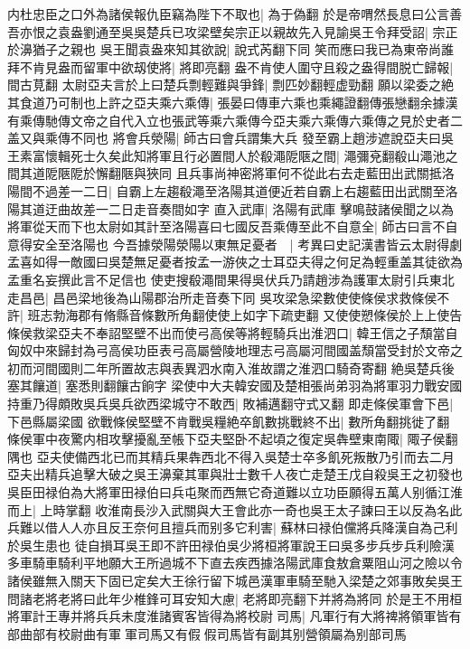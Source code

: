 内杜忠臣之口外為諸侯報仇臣竊為陛下不取也|{
	為于偽翻}
於是帝喟然長息曰公言善吾亦恨之袁盎劉通至吳吳楚兵已攻梁壁矣宗正以親故先入見諭吳王令拜受詔|{
	宗正於濞猶子之親也}
吳王聞袁盎來知其欲說|{
	說式芮翻下同}
笑而應曰我已為東帝尚誰拜不肯見盎而留軍中欲刼使將|{
	將即亮翻}
盎不肯使人圍守且殺之盎得間脱亡歸報|{
	間古莧翻}
太尉亞夫言於上曰楚兵剽輕難與爭鋒|{
	剽匹妙翻輕虚勁翻}
願以梁委之絶其食道乃可制也上許之亞夫乘六乘傳|{
	張晏曰傳車六乘也乘繩證翻傳張戀翻余據漢有乘傳馳傳文帝之自代入立也張武等乘六乘傳今亞夫乘六乘傳六乘傳之見於史者二盖又與乘傳不同也}
將會兵滎陽|{
	師古曰會兵謂集大兵}
發至霸上趙涉遮說亞夫曰吳王素富懷輯死士久矣此知將軍且行必置間人於殽澠阸陿之間|{
	澠彌兗翻殽山澠池之間其道阸陿阸於懈翻陿與狹同}
且兵事尚神密將軍何不從此右去走藍田出武關抵洛陽間不過差一二日|{
	自霸上左趨殽澠至洛陽其道便近若自霸上右趨藍田出武關至洛陽其道迂曲故差一二日走音奏間如字}
直入武庫|{
	洛陽有武庫}
擊鳴鼓諸侯聞之以為將軍從天而下也太尉如其計至洛陽喜曰七國反吾乘傳至此不自意全|{
	師古曰言不自意得安全至洛陽也}
今吾據滎陽滎陽以東無足憂者　|{
	考異曰史記漢書皆云太尉得劇孟喜如得一敵國曰吳楚無足憂者按孟一游俠之士耳亞夫得之何足為輕重盖其徒欲為孟重名妄撰此言不足信也}
使吏搜殽澠間果得吳伏兵乃請趙涉為護軍太尉引兵東北走昌邑|{
	昌邑梁地後為山陽郡治所走音奏下同}
吳攻梁急梁數使使條侯求救條侯不許|{
	班志勃海郡有脩縣音條數所角翻使使上如字下疏吏翻}
又使使愬條侯於上上使告條侯救梁亞夫不奉詔堅壁不出而使弓高侯等將輕騎兵出淮泗口|{
	韓王信之子頹當自匈奴中來歸封為弓高侯功臣表弓高屬營陵地理志弓高屬河間國盖頹當受封於文帝之初而河間國則二年所置故志與表異泗水南入淮故謂之淮泗口騎奇寄翻}
絶吳楚兵後塞其饟道|{
	塞悉則翻饟古餉字}
梁使中大夫韓安國及楚相張尚弟羽為將軍羽力戰安國持重乃得頗敗吳兵吳兵欲西梁城守不敢西|{
	敗補邁翻守式又翻}
即走條侯軍會下邑|{
	下邑縣屬梁國}
欲戰條侯堅壁不肯戰吳糧絶卒飢數挑戰終不出|{
	數所角翻挑徙了翻}
條侯軍中夜驚内相攻擊擾亂至帳下亞夫堅卧不起頃之復定吳犇壁東南陬|{
	陬子侯翻隅也}
亞夫使備西北已而其精兵果犇西北不得入吳楚士卒多飢死叛散乃引而去二月亞夫出精兵追擊大破之吳王濞棄其軍與壯士數千人夜亡走楚王戊自殺吳王之初發也吳臣田禄伯為大將軍田禄伯曰兵屯聚而西無它奇道難以立功臣願得五萬人别循江淮而上|{
	上時掌翻}
收淮南長沙入武關與大王會此亦一奇也吳王太子諫曰王以反為名此兵難以借人人亦且反王奈何且擅兵而别多它利害|{
	蘇林曰禄伯儻將兵降漢自為己利於吳生患也}
徒自損耳吳王即不許田禄伯吳少將桓將軍說王曰吳多步兵步兵利險漢多車騎車騎利平地願大王所過城不下直去疾西據洛陽武庫食敖倉粟阻山河之險以令諸侯雖無入關天下固已定矣大王徐行留下城邑漢軍車騎至馳入梁楚之郊事敗矣吳王問諸老將老將曰此年少椎鋒可耳安知大慮|{
	老將即亮翻下并將為將同}
於是王不用桓將軍計王專并將兵兵未度淮諸賓客皆得為將校尉司馬|{
	凡軍行有大將禆將領軍皆有部曲部有校尉曲有軍軍司馬又有假假司馬皆有副其别營領屬為别部司馬}
